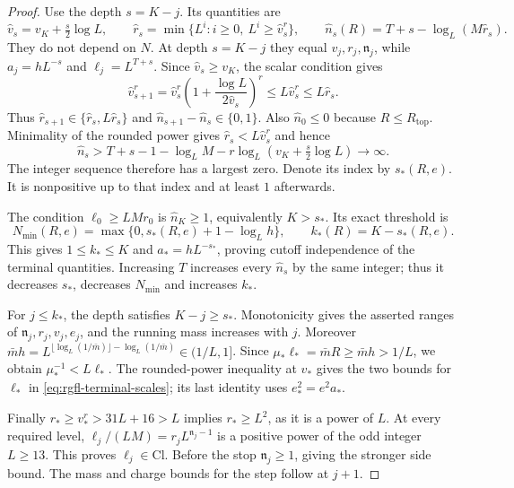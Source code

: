 \begin{proof}
Use the depth $s=K-j$. Its quantities are
\[
 \widehat v_s=v_K+\tfrac{s}{2}\log L,\qquad
 \widehat r_s=\min\{L^i:i\ge0,\ L^i\ge\widehat v_s^r\},\qquad
 \widehat n_s(R)=T+s-\log_L(M\widehat r_s).
\]
They do not depend on $N$. At depth $s=K-j$ they
equal $v_j,r_j,\mathfrak n_j$, while
$a_j=hL^{-s}$ and $\ell_j=L^{T+s}$.
Since $\widehat v_s\ge v_K$, the scalar condition gives
\[
 \widehat v_{s+1}^r
   =\widehat v_s^r\left(1+\frac{\log L}{2\widehat v_s}\right)^r
                    \le L\widehat v_s^r\le L\widehat r_s.
\]
Thus
$\widehat r_{s+1}\in\{\widehat r_s,L\widehat r_s\}$
and $\widehat n_{s+1}-\widehat n_s\in\{0,1\}$.
Also $\widehat n_0\le0$ because $R\le R_{\mathrm{top}}$.
Minimality of the rounded power gives
$\widehat r_s<L\widehat v_s^r$ and hence
\[
 \widehat n_s>T+s-1-\log_LM-r\log_L(v_K+\tfrac{s}{2}\log L)
                                                    \longrightarrow\infty .
\]
The integer sequence therefore has a largest zero.
Denote its index by $s_*(R,e)$.
It is nonpositive up to that index and at least $1$
afterwards.

The condition $\ell_0\ge LMr_0$ is
$\widehat n_K\ge1$, equivalently $K>s_*$.
Its exact threshold is
\begin{equation}\label{eq:rgfl-mesh-threshold}
 N_{\min}(R,e)=\max\{0,s_*(R,e)+1-\log_Lh\},
             \qquad k_*(R)=K-s_*(R,e).
\end{equation}
This gives $1\le k_*\le K$ and
$a_*=hL^{-s_*}$, proving cutoff independence of
the terminal quantities.
Increasing $T$ increases every $\widehat n_s$
by the same integer; thus it decreases $s_*$,
decreases $N_{\min}$ and increases $k_*$.

For $j\le k_*$, the depth satisfies $K-j\ge s_*$.
Monotonicity gives the asserted ranges of
$\mathfrak n_j,r_j,v_j,e_j$, and the running mass
increases with $j$.
Moreover
$\bar m h=L^{\lfloor\log_L(1/\bar m)\rfloor-\log_L(1/\bar m)}
\in(1/L,1]$.
Since $\mu_*\ell_*=\bar mR\ge\bar m h>1/L$,
we obtain $\mu_*^{-1}<L\ell_*$.
The rounded-power inequality at $v_*$ gives
the two bounds for $\ell_*$ in
\eqref{eq:rgfl-terminal-scales}; its last identity
uses $e_*^2=e^2a_*$.

Finally $r_*\ge v_*^r>31L+16>L$ implies
$r_*\ge L^2$, as it is a power of $L$.
At every required level,
$\ell_j/(LM)=r_jL^{\mathfrak n_j-1}$
is a positive power of the odd integer $L\ge13$.
This proves $\ell_j\in\mathrm{Cl}$.
Before the stop $\mathfrak n_j\ge1$, giving the
stronger side bound. The mass and charge bounds
for the step follow at $j+1$.
\end{proof}

